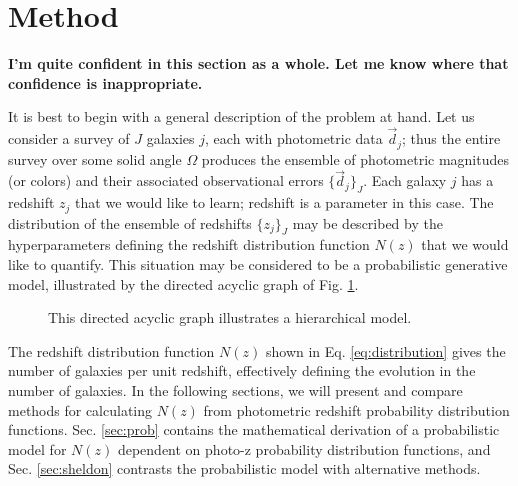 \documentclass[preprint]{aastex}
\begin{document}
\clearpage
\section{Method}
\label{sec:meth}

\textbf{I'm quite confident in this section as a whole.  Let me know where that 
confidence is inappropriate.}

It is best to begin with a general description of the problem at hand.  Let us 
consider a survey of $J$ galaxies $j$, each with photometric data 
$\vec{d}_{j}$; thus the entire survey over some solid angle $\Omega$ produces 
the ensemble of photometric magnitudes (or colors) and their associated 
observational errors $\{\vec{d}_{j}\}_{J}$.  Each galaxy $j$ has a redshift 
$z_{j}$ that we would like to learn; redshift is a parameter in this case.  The 
distribution of the ensemble of redshifts $\{z_{j}\}_{J}$ may be described by 
the hyperparameters defining the redshift distribution function $N(z)$ that we 
would like to quantify.  This situation may be considered to be a probabilistic 
generative model, illustrated by the directed acyclic graph of Fig. 
\ref{fig:flow}.  

\begin{figure}
\vspace{0.5cm}
\begin{center}
\caption{This directed acyclic graph illustrates a hierarchical model.}
\label{fig:flow}
\end{center}
\end{figure}

The redshift distribution function $N(z)$ shown in Eq. \ref{eq:distribution} 
gives the number of galaxies per unit redshift, effectively defining the 
evolution in the number of galaxies.  \citep{Menard2013}  In the following 
sections, we will present and compare methods for calculating $N(z)$ from 
photometric redshift probability distribution functions.  Sec. \ref{sec:prob} 
contains the mathematical derivation of a probabilistic model for $N(z)$ 
dependent on photo-z probability distribution functions, and Sec. 
\ref{sec:sheldon} contrasts the probabilistic model with alternative methods.
\end{document}
